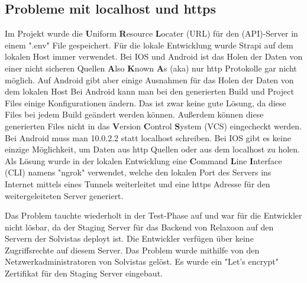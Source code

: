 \begin{spacing}{1}


    \section{Probleme mit localhost und https}\label{sec:probleme-mit-localhost-und-https}

    Im Projekt wurde  die \textbf{U}niform \textbf{R}esource
    \textbf{L}ocater (URL) für den (API)-Server in einem ".env" File gespeichert.
    Für die lokale Entwicklung wurde Strapi auf dem lokalen Host immer verwendet.
    Bei IOS und Android ist das Holen der Daten von einer nicht sicheren Quellen
    \textbf{A}lso \textbf{K}nown \textbf{A}s (aka) nur http Protokolle gar nicht möglich. Auf Android gibt aber einige
    Ausnahmen für das Holen der Daten von dem lokalen Host
    Bei Android kann man bei den generierten Build und Project Files einige Konfigurationen ändern.
    Das ist zwar keine gute Lösung, da diese Files bei jedem Build geändert werden können.
    Außerdem können diese generierten Files nicht in das \textbf{V}ersion \textbf{C}ontrol \textbf{S}ystem (VCS)
    eingecheckt werden.
    Bei Android muss man 10.0.2.2 statt localhost schreiben.\cite{androidFetch}
    Bei IOS gibt es keine einzige Möglichkeit,
    um Daten aus http Quellen oder aus dem localhost zu holen.
    Als Lösung wurde in der lokalen Entwicklung eine \textbf{C}ommand \textbf{L}ine \textbf{I}nterface (CLI) namens "ngrok" verwendet,
    welche den lokalen Port des Servers ins Internet mittels eines Tunnels weiterleitet
    und eine https Adresse für den weitergeleiteten Server generiert.

    Das Problem tauchte wiederholt in der Test-Phase auf und war für die Entwickler nicht lösbar,
    da der Staging Server für das Backend von Relaxoon auf den Servern der Solvistas deployt ist.
    Die Entwickler verfügen über keine Zugriffsrechte auf diesem Server.
    Das Problem wurde mithilfe von den Netzwerkadministratoren von Solvistas gelöst.
    Es wurde ein "Let's encrypt" Zertifikat für den Staging Server eingebaut.






\end{spacing}
